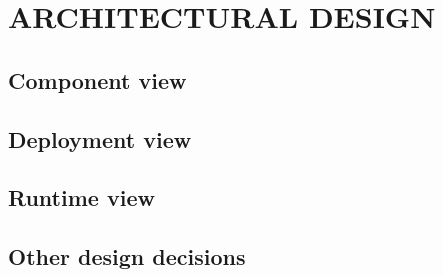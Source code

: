 \section{ARCHITECTURAL DESIGN}

	

	

	\subsection{Component view}

	\subsection{Deployment view}

	\subsection{Runtime view}

	
	\subsection{Other design decisions}
